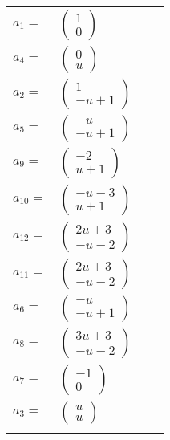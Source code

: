 \documentclass[1p]{elsarticle_modified}
\theoremstyle{definition}
\begin{document}
\begin{tabular}{m{7pt} m{180pt} m{7pt} m{180pt} }
\flushright $a_{1}=$&$\begin{pmatrix}1\\0\end{pmatrix}$ \\
\flushright $a_{4}=$&$\begin{pmatrix}0\\u\end{pmatrix}$ \\
\flushright $a_{2}=$&$\begin{pmatrix}1\\- u+1\end{pmatrix}$ \\
\flushright $a_{5}=$&$\begin{pmatrix}- u\\- u+1\end{pmatrix}$ \\
\flushright $a_{9}=$&$\begin{pmatrix}-2\\u+1\end{pmatrix}$ \\
\flushright $a_{10}=$&$\begin{pmatrix}- u-3\\u+1\end{pmatrix}$ \\
\flushright $a_{12}=$&$\begin{pmatrix}2 u+3\\- u-2\end{pmatrix}$ \\
\flushright $a_{11}=$&$\begin{pmatrix}2 u+3\\- u-2\end{pmatrix}$ \\
\flushright $a_{6}=$&$\begin{pmatrix}- u\\- u+1\end{pmatrix}$ \\
\flushright $a_{8}=$&$\begin{pmatrix}3 u+3\\- u-2\end{pmatrix}$ \\
\flushright $a_{7}=$&$\begin{pmatrix}-1\\0\end{pmatrix}$ \\
\flushright $a_{3}=$&$\begin{pmatrix}u\\u\end{pmatrix}$\\&\end{tabular}
\end{document}
